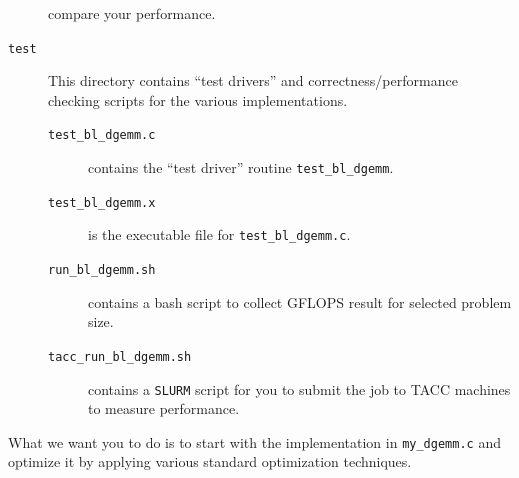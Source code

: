 \begin{description}
compare your performance.
\item[{\tt test}] This directory contains ``test drivers'' and correctness/performance checking scripts for the various implementations.
\begin{description}
\item[{\tt test\_bl\_dgemm.c}] contains the ``test driver'' routine {\tt test\_bl\_dgemm}. 
\item[{\tt test\_bl\_dgemm.x}] is the executable file for {\tt test\_bl\_dgemm.c}. 
\item[{\tt run\_bl\_dgemm.sh}] contains a bash script to collect GFLOPS result for selected problem size.
\item[{\tt tacc\_run\_bl\_dgemm.sh}] contains a {\tt SLURM} script for you to submit the job to TACC machines to measure performance.
\end{description}
\item[{\tt }]
\end{description}



What we want you to do is to start with the implementation in {\tt my\_dgemm.c} and optimize it by applying various standard optimization techniques.




